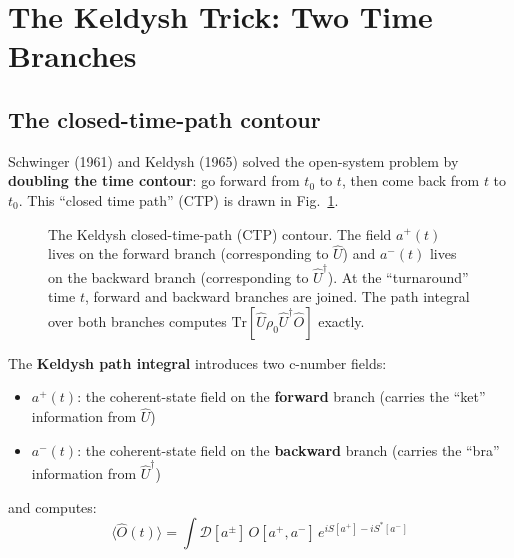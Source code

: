 \documentclass[12pt]{article}
\newcommand{\av}[1]{\langle #1 \rangle}
\begin{document}
\section{The Keldysh Trick: Two Time Branches}

\subsection{The closed-time-path contour}

Schwinger (1961) and Keldysh (1965) solved the open-system problem
by \textbf{doubling the time contour}: go forward from $t_0$ to $t$,
then come back from $t$ to $t_0$. This ``closed time path'' (CTP) is
drawn in Fig.~\ref{fig:CTP}.

\begin{figure}[h]
\centering
{}
\caption{The Keldysh closed-time-path (CTP) contour.  The field $a^+(t)$
lives on the forward branch (corresponding to $\hat{U}$) and $a^-(t)$ lives
on the backward branch (corresponding to $\hat{U}^\dagger$).  At the
``turnaround'' time $t$, forward and backward branches are joined.
The path integral over both branches computes $\mathrm{Tr}[\hat{U}\rho_0
\hat{U}^\dagger\hat{O}]$ exactly.}
\label{fig:CTP}
\end{figure}

The \textbf{Keldysh path integral} introduces two c-number fields:
\begin{itemize}
  \item $a^+(t)$: the coherent-state field on the \textbf{forward} branch
    (carries the ``ket'' information from $\hat{U}$)
  \item $a^-(t)$: the coherent-state field on the \textbf{backward} branch
    (carries the ``bra'' information from $\hat{U}^\dagger$)
\end{itemize}
and computes:
\begin{equation}
  \av{\hat{O}(t)} =
  \int\mathcal{D}[a^\pm]\,O[a^+,a^-]\,
  e^{iS[a^+] - iS^*[a^-]}
  \label{eq:Keldysh_PI}
\end{equation}
\end{document}
